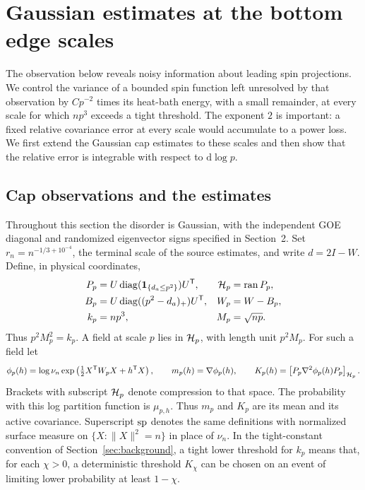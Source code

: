 \section{Gaussian estimates at the bottom edge scales}
\label{sec:edge-estimates}

The observation below reveals noisy information about leading spin
projections.  We control the variance of a bounded spin function left
unresolved by that observation by \(Cp^{-2}\) times its heat-bath energy,
with a small remainder, at every scale for which \(np^3\) exceeds a tight
threshold.  The exponent \(2\) is important: a fixed
relative covariance error at every scale would accumulate to a power loss.
We first extend the Gaussian cap estimates to these scales and then show
that the relative error is integrable with respect to \(\mathrm d\log p\).

\subsection{Cap observations and the estimates}

Throughout this section the disorder is Gaussian, with the independent
GOE diagonal and randomized eigenvector signs specified in Section~2.
Set \(r_n=n^{-1/3+10^{-4}}\), the terminal scale of the source estimates,
and write \(d=2I-W\).  Define, in physical coordinates,
\[
\begin{aligned}
 P_p&=U\operatorname{diag}(\mathbf 1_{\{d_a\le p^2\}})U^{\mathsf T},&
 \mathcal H_p&=\operatorname{ran}P_p,\\
 B_p&=U\operatorname{diag}((p^2-d_a)_+)U^{\mathsf T},&
 W_p&=W-B_p,\\
 k_p&=np^3,&M_p&=\sqrt{np}.
\end{aligned}
\]
Thus \(p^2M_p^2=k_p\).  A field at scale \(p\) lies in \(\mathcal H_p\), with
length unit \(p^2M_p\).  For such a field let
\[
 \phi_p(h)=\log\nu_n
 \exp\left(\tfrac12 X^{\mathsf T}W_pX+h^{\mathsf T}X\right),
 \qquad m_p(h)=\nabla\phi_p(h),\qquad
 K_p(h)=\left[P_p\nabla^2\phi_p(h)P_p\right]_{\mathcal H_p}.
\]
Brackets with subscript \(\mathcal H_p\) denote compression to that space.
The probability with this log partition function is \(\mu_{p,h}\).
Thus \(m_p\) and \(K_p\) are its mean and its active covariance.
Superscript \({\rm sp}\) denotes the same definitions with normalized
surface measure on \(\{X:\|X\|^2=n\}\) in place of \(\nu_n\).
In the tight-constant convention of Section~\ref{sec:background}, a tight
lower threshold for \(k_p\) means that, for each \(\chi>0\), a deterministic
threshold \(K_\chi\) can be chosen on an event of limiting lower
probability at least \(1-\chi\).


